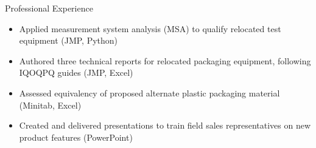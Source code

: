 \documentclass{resume}
\begin{document}
\begin{experienceSection}{Professional Experience}
    \experienceItem[
        company={Stryker Solutions},
        location={Phoenix, AZ},
        position={Research \& Dev Development Intern},
        duration={May 2019 – Aug 2019}
    ]
    \begin{itemize}
        \itemsep -6pt {}
        \item Applied measurement system analysis (MSA) to qualify relocated test equipment (JMP, Python)
        \item Authored three technical reports for relocated packaging equipment, following IQOQPQ guides (JMP, Excel)
    \end{itemize}

    \experienceItem[
        company={Med Apps},
        location={Scottsdale, AZ},
        position={Quality Engineering Intern},
        duration={May 2018 – Aug 2018}
    ]
    \begin{itemize}
        \itemsep -6pt {}
        \item Assessed equivalency of proposed alternate plastic packaging material (Minitab, Excel)
        \item Created and delivered presentations to train field sales representatives on new product features (PowerPoint)
    \end{itemize}

\end{experienceSection}
\end{document}
